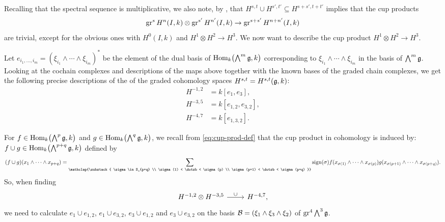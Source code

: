 Recalling that the spectral sequence is multiplicative, we also note, by , that $H^{s,t} \cup H^{s',t'} \subseteq H^{s+s',t+t'}$ implies that the cup products
\begin{equation*}
  \operatorname{gr}^{s} H^{n}(I,k) \otimes \operatorname{gr}^{s'} H^{n'}(I,k) \to \operatorname{gr}^{s+s'} H^{n+n'}(I,k)
\end{equation*}
are trivial, except for the obvious ones with $H^{0}(I,k)$ and $H^{1} \otimes H^{2} \to H^{3}$. We now want to describe the cup product $H^{1} \otimes H^{2} \to H^{3}$.

Let $e_{i_{1},\dotsc,i_{m}} = (\xi_{i_{1}} \wedge \dotsb \wedge \xi_{i_{m}})^{*}$ be the element of the dual basis of $\operatorname{Hom}_{k}\bigl( \bigwedge^{m}\mathfrak{g},k \bigr)$ corresponding to $\xi_{i_{1}} \wedge \dotsb \wedge \xi_{i_{m}}$ in the basis of $\bigwedge^{m}\mathfrak{g}$. Looking at the cochain complexes and descriptions of the maps above together with the known bases of the graded chain complexes, we get the following precise descriptions of the of the graded cohomology spaces $H^{s,t} = H^{s,t}(\mathfrak{g},k)$:
\begin{equation}\label{eq:Hst-spaces-SL2}
  \begin{aligned}
    H^{-1,2} &= k[e_{1},e_{3}], \\
    H^{-3,5} &= k[e_{1,2},e_{3,2}], \\
    H^{-4,7} &= k[e_{1,3,2}].
  \end{aligned}
\end{equation}

For $f \in \operatorname{Hom}_{k}\bigl( \bigwedge^{p}\mathfrak{g}, k \bigr)$ and $g \in \operatorname{Hom}_{k}\bigl( \bigwedge^{q}\mathfrak{g}, k \bigr)$, we recall from \eqref{eq:cup-prod-def} that the cup product in cohomology is induced by: $f \cup g \in \operatorname{Hom}_{k}\bigl( \bigwedge^{p+q}\mathfrak{g}, k \bigr)$ defined by
\begin{equation*}
  (f \cup g)(x_{1} \wedge \dotsb \wedge x_{p+q})  = \sum_{\mathclap{\substack{ \sigma \in S_{p+q} \\ \sigma(1) < \dotsb < \sigma(p) \\ \sigma(p+1) < \dotsb < \sigma(p+q) }}} \sign(\sigma) f(x_{\sigma(1)} \wedge \dotsb \wedge x_{\sigma(p)}) g(x_{\sigma(p+1)} \wedge \dotsb \wedge x_{\sigma(p+q)}).
\end{equation*}
So, when finding
\[
  \begin{tikzcd}
    H^{-1,2} \otimes H^{-3,5} \ar[r,"\cup"] & H^{-4,7},
  \end{tikzcd}
\]
we need to calculate $e_{1} \cup e_{1,2}$, $e_{1} \cup e_{3,2}$, $e_{3} \cup e_{1,2}$ and $e_{3} \cup e_{3,2}$ on the basis $\mathcal{B} = (\xi_{1} \wedge \xi_{3} \wedge \xi_{2})$ of $\operatorname{gr}^{4} \bigwedge^{3} \mathfrak{g}$.

